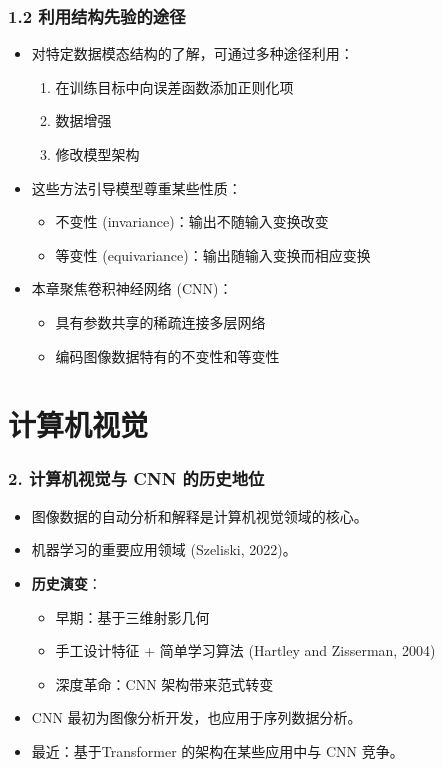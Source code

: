 \documentclass[t,aspectratio=169]{beamer} %
\begin{document}
\begin{frame}
    \frametitle{1.2 利用结构先验的途径}
    \begin{itemize}
        \item 对特定数据模态结构的了解，可通过多种途径利用：
        \begin{enumerate}
            \item 在训练目标中向误差函数添加\alert{正则化项}
            \item \alert{数据增强}
            \item 修改\alert{模型架构}
        \end{enumerate}
        \item 这些方法引导模型尊重某些性质：
        \begin{itemize}
            \item \alert{不变性} (invariance)：输出不随输入变换改变
            \item \alert{等变性} (equivariance)：输出随输入变换而相应变换
        \end{itemize}
        \item 本章聚焦\alert{卷积神经网络} (CNN)：
        \begin{itemize}
            \item 具有\alert{参数共享}的\alert{稀疏连接}多层网络
            \item 编码图像数据特有的不变性和等变性
        \end{itemize}
    \end{itemize}
\end{frame}

\section{计算机视觉}

\begin{frame}
    \frametitle{2. 计算机视觉与 CNN 的历史地位}
    \begin{itemize}
        \item 图像数据的自动分析和解释是\alert{计算机视觉}领域的核心。
        \item 机器学习的重要应用领域 (Szeliski, 2022)。
        \item \textbf{历史演变}：
        \begin{itemize}
            \item 早期：基于\alert{三维射影几何}
            \item 手工设计特征 + 简单学习算法 (Hartley and Zisserman, 2004)
            \item 深度革命：CNN 架构带来\alert{范式转变}
        \end{itemize}
        \item CNN 最初为图像分析开发，也应用于\alert{序列数据}分析。
        \item 最近：基于\alert{Transformer} 的架构在某些应用中与 CNN 竞争。
    \end{itemize}
\end{frame}
\end{document}

